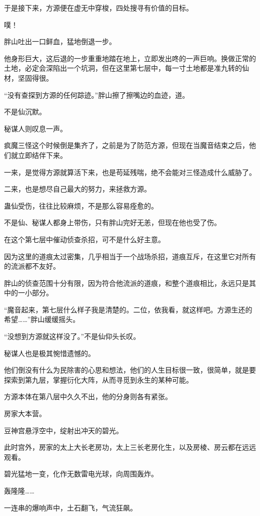 \begin{this_body}
于是接下来，方源便在虚无中穿梭，四处搜寻有价值的目标。

噗！

胖山吐出一口鲜血，猛地倒退一步。

他身形巨大，这后退的一步重重地踏在地上，立即发出咚的一声巨响。换做正常的土地，必定会深陷出一个坑洞，但在这里第七层中，每一寸土地都是准九转的仙材，坚固得很。

“没有查探到方源的任何踪迹。”胖山擦了擦嘴边的血迹，道。

不是仙沉默。

秘谋人则叹息一声。

疯魔三怪这个时候倒是集齐了，之前是为了防范方源，但现在当魔音结束之后，他们就立即结伴下来。

一来，是觉得方源就算活下来，也是苟延残喘，绝不会能对三怪造成什么威胁了。

二来，也是想尽自己最大的努力，来拯救方源。

蛊仙受伤，往往比较麻烦，不是那么容易痊愈的。

不是仙、秘谋人都身上带伤，只有胖山完好无恙，但现在他也受了伤。

在这个第七层中催动侦查杀招，可不是什么好主意。

因为这里的道痕太过密集，几乎相当于一个战场杀招，道痕互斥，在这里它对所有的流派都不友好。

胖山的侦查范围十分有限，因为符合他流派的道痕，和整个道痕相比，永远只是其中的一小部分。

“魔音起来，第七层什么样子我是清楚的。二位，依我看，就这样吧。方源生还的希望……”胖山缓缓摇头。

“没想到方源就这样没了。”不是仙仰头长叹。

秘谋人也是极其惋惜遗憾的。

他们倒没有什么为民除害的心思和想法，他们的人生目标很一致，很简单，就是要探索到第九层，掌握衍化大阵，从而寻觅到永生的某种可能。

方源本体在第八层中久久不出，他的分身则各有紧张。

房家大本营。

豆神宫悬浮空中，绽射出冲天的碧光。

此时宫外，房家的太上大长老房功，太上三长老房化生，以及房棱、房云都在远远观看。

碧光猛地一变，化作无数雷电光球，向周围轰炸。

轰隆隆……

一连串的爆响声中，土石翻飞，气流狂飙。


\end{this_body}
